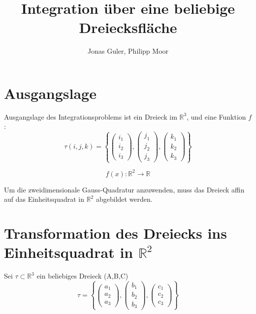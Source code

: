 \documentclass[12pt]{article}
\begin{document}
\title{Integration über eine beliebige Dreiecksfläche}
\author{Jonas Guler, Philipp Moor}
\maketitle
\pagestyle{scrheadings}
\clearscrheadfoot
{}
\ofoot{\pagemark}

\newpage

\section{Ausgangslage}
Ausgangslage des Integrationsproblems ist ein Dreieck im $\mathbb{R}^3$, und eine Funktion $f$:
\[
\tau(i,j,k) =
\left \{
		 \begin{pmatrix} i_1\\ i_2 \\ i_3 \end{pmatrix}
		 ,
		 \begin{pmatrix} j_1\\ j_2 \\ j_3 \end{pmatrix}
		 ,
		 \begin{pmatrix} k_1\\ k_2 \\ k_3 \end{pmatrix}
\right \}
\]


\[
   f(x) : \mathbb{R}^2 \rightarrow \mathbb{R}
\]

Um die zweidimensionale Gauss-Quadratur anzuwenden, muss das Dreieck affin auf das Einheitsquadrat in $\mathbb{R}^2$ abgebildet werden.

\section{Transformation des Dreiecks ins \\ Einheitsquadrat in $\mathbb{R}^2$}
Sei $\tau\subset \mathbb{R}^3$ ein beliebiges Dreieck (A,B,C)
\[
\tau = \left \{
\begin{pmatrix} a_1\\ a_2 \\ a_3 \end{pmatrix}
,
\begin{pmatrix} b_1\\ b_2 \\ b_3 \end{pmatrix}
,
\begin{pmatrix} c_1\\ c_2 \\ c_3 \end{pmatrix}
\right \}
\]
\end{document}
